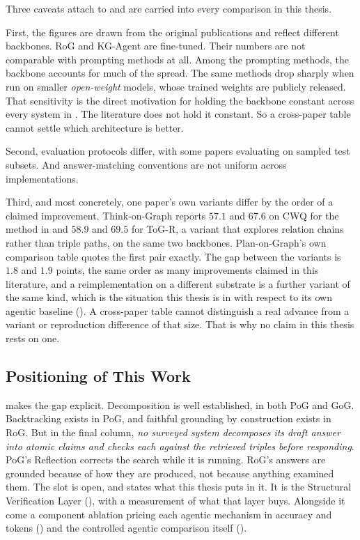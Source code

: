 Three caveats attach to  and are carried into every
comparison in this thesis.

First, the figures are drawn from the original publications and reflect
different backbones. RoG and KG-Agent are fine-tuned. Their numbers are not
comparable with prompting methods at all. Among the prompting methods, the
backbone accounts for much of the spread. The same methods drop sharply when run
on smaller \emph{open-weight} models, whose trained weights are publicly
released. That sensitivity is the direct motivation for holding the backbone
constant across every system in . The literature does not hold
it constant. So a cross-paper table cannot settle which architecture is better.

Second, evaluation protocols differ, with some papers evaluating on sampled test
subsets. And answer-matching conventions are not uniform across implementations.

Third, and most concretely, one paper's own variants differ by the order of a
claimed improvement. Think-on-Graph reports $57.1$ and $67.6$ on CWQ for the
method in  and $58.9$ and $69.5$ for ToG-R, a variant that
explores relation chains rather than triple paths, on the same two backbones.
Plan-on-Graph's own comparison table quotes the first pair exactly. The gap
between the variants is $1.8$ and $1.9$ points, the same order as many
improvements claimed in this literature, and a reimplementation on a different
substrate is a further variant of the same kind, which is the situation this
thesis is in with respect to its own agentic baseline ().
A cross-paper table cannot distinguish a real advance from a variant or
reproduction difference of that size. That is why no claim in this thesis rests
on one.

\subsection{Positioning of This Work}\label{sec:positioning}

 makes the gap explicit. Decomposition is well established,
in both PoG and GoG. Backtracking exists in PoG, and faithful grounding by
construction exists in RoG. But in the final column, \emph{no surveyed system
decomposes its draft answer into atomic claims and checks each against the
retrieved triples before responding}. PoG's Reflection corrects the search while
it is running. RoG's answers are grounded because of how they are produced, not
because anything examined them. The slot is open, and 
states what this thesis puts in it. It is the Structural Verification Layer
(), with a measurement of what that layer buys.
Alongside it come a component ablation pricing each agentic mechanism in
accuracy and tokens () and the controlled agentic comparison
itself ().

